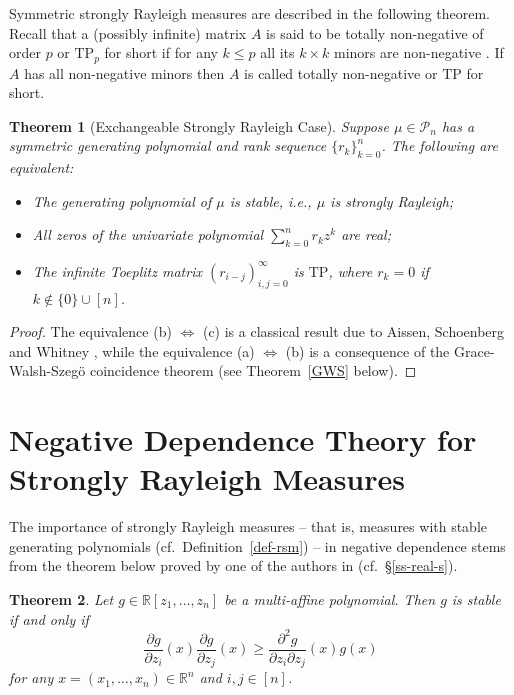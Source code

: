 \documentclass[10pt,reqno]{amsart}
\theoremstyle{plain}
\newtheorem{theorem}{Theorem}[section]
\theoremstyle{definition}
\theoremstyle{remark}
\newcommand{\PP}{\mathcal{P}}
\newcommand{\TP}{\text{TP}}
\newcommand{\RR}{\mathbb{R}}
\begin{document}
Symmetric strongly Rayleigh measures are described in the following theorem. 
Recall that a (possibly infinite) matrix 
$A$ is said to be totally 
non-negative of order $p$ or $\text{TP}_p$ for short 
if for any $k\le p$ all its $k \times k$ minors are non-negative \cite{Kar}.
If $A$ has all non-negative minors then $A$ is called 
totally non-negative or $\TP$ for short. 

\begin{theorem}[Exchangeable Strongly Rayleigh Case]\label{ESC}
Suppose $\mu\in\PP_n$ has a symmetric generating polynomial and 
rank sequence $\{r_k\}_{k=0}^n$. The following are equivalent:
\begin{itemize}
\item[(a)] The generating polynomial of $\mu$ is stable, i.e., $\mu$ is
strongly Rayleigh; 
\item[(b)] All zeros of the univariate polynomial $\sum_{k=0}^{n}r_kz^k$
are real; 
\item[(c)] The infinite Toeplitz matrix $(r_{i-j})_{i,j=0}^{\infty}$ is $\TP$,
where $r_k=0$ if $k\notin \{0\}\cup [n]$. 
\end{itemize}
\end{theorem}

\begin{proof}
The equivalence (b) $\Leftrightarrow$ (c) is a classical result due to 
Aissen, Schoenberg and 
Whitney \cite{ASW}, while the equivalence (a) $\Leftrightarrow$ (b) is a 
consequence of the Grace-Walsh-Szeg\"o coincidence theorem 
(see Theorem~\ref{GWS} below). 
\end{proof}

\section{Negative Dependence Theory for Strongly Rayleigh 
Measures}\label{s-stable}

The importance of strongly Rayleigh measures -- that is, measures with stable 
generating polynomials (cf.~Definition~\ref{def-rsm}) -- in negative 
dependence stems from the theorem below proved by one of the authors  
in \cite{PB} (cf.~\S \ref{ss-real-s}).  

\begin{theorem}\label{stable-Rayleigh}
Let $g \in \RR[z_1,\ldots, z_n]$ be a multi-affine polynomial. Then $g$ is 
stable if and only if 
$$
\frac {\partial g} {\partial z_i}(x) \frac {\partial g} {\partial z_j}(x) 
\geq \frac {\partial^2 g} {\partial z_i \partial z_j}(x) g(x)$$
for any $x=(x_1,\ldots,x_n)\in \RR^n$ and $i,j\in [n]$.
\end{theorem}
\end{document}
